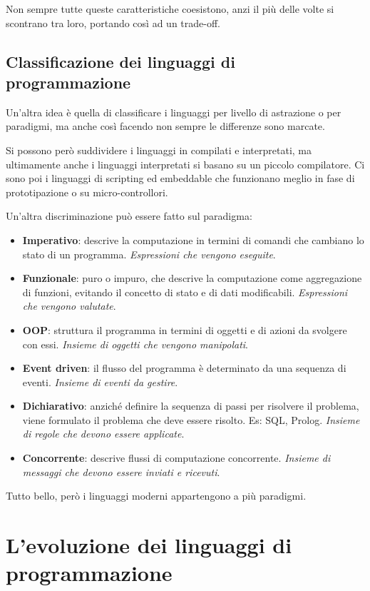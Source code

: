 \noindent Non sempre tutte queste caratteristiche coesistono, anzi il più delle volte si scontrano tra loro, portando così ad un trade-off.

\subsection{Classificazione dei linguaggi di programmazione}

Un'altra idea è quella di classificare i linguaggi per livello di astrazione o per paradigmi, ma anche così facendo non sempre le differenze sono marcate.

Si possono però suddividere i linguaggi in compilati e interpretati, ma ultimamente anche i linguaggi interpretati si basano su un piccolo compilatore.
Ci sono poi i linguaggi di scripting ed embeddable che funzionano meglio in fase di prototipazione o su micro-controllori.

Un'altra discriminazione può essere fatto sul paradigma:

\begin{itemize}
	\item \textbf{Imperativo}: descrive la computazione in termini di comandi che cambiano lo stato di un programma. \textit{Espressioni che vengono eseguite}.
	\item \textbf{Funzionale}: puro o impuro, che descrive la computazione come aggregazione di funzioni, evitando il concetto di stato e di dati modificabili. \textit{Espressioni che vengono valutate}.
	\item \textbf{OOP}: struttura il programma in termini di oggetti e di azioni da svolgere con essi. \textit{Insieme di oggetti che vengono manipolati}.
	\item \textbf{Event driven}: il flusso del programma è determinato da una sequenza di eventi. \textit{Insieme di eventi da gestire}.
	\item \textbf{Dichiarativo}: anziché definire la sequenza di passi per risolvere il problema, viene formulato il problema che deve essere risolto. Es: SQL, Prolog. \textit{Insieme di regole che devono essere applicate}.
	\item \textbf{Concorrente}: descrive flussi di computazione concorrente. \textit{Insieme di messaggi che devono essere inviati e ricevuti}.
\end{itemize}

\noindent Tutto bello, però i linguaggi moderni appartengono a più paradigmi.

\section{L'evoluzione dei linguaggi di programmazione}

